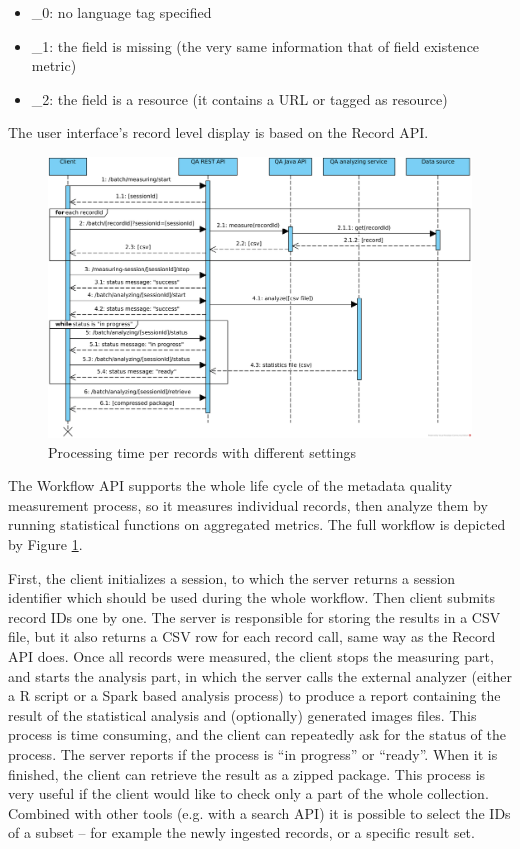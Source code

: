 \begin{itemize}
  \setlength{\parskip}{0pt}
  \setlength{\itemsep}{0pt plus 1pt}
  \item \_0: no language tag specified
  \item \_1: the field is missing (the very same information that of field existence metric)
  \item \_2: the field is a resource (it contains a URL or tagged as resource)
\end{itemize}

The user interface's record level display is based on the Record API.

\begin{figure}
\includegraphics[width=\textwidth]{images/chapter05/QA-REST-API-interactions.png}
\caption{Processing time per records with different settings}
\label{fig:workflow-api}
\end{figure}

The Workflow API supports the whole life cycle of the metadata quality measurement process, so it measures individual records, then analyze them by running statistical functions on aggregated metrics. The full workflow is depicted by Figure \ref{fig:workflow-api}. 

First, the client initializes a session, to which the server returns a session identifier which should be used during the whole workflow. Then client submits record IDs one by one. The server is responsible for storing the results in a CSV file, but it also returns a CSV row for each record call, same way as the Record API does. Once all records were measured, the client stops the measuring part, and starts the analysis part, in which the server calls the external analyzer (either a R script or a Spark based analysis process) to produce a report containing the result of the statistical analysis and (optionally) generated images files. This process is time consuming, and the client can repeatedly ask for the status of the process. The server reports if the process is ``in progress'' or ``ready''. When it is finished, the client can retrieve the result as a zipped package. This process is very useful if the client would like to check only a part of the whole collection. Combined with other tools (e.g. with a search API) it is possible to select the IDs of a subset -- for example the newly ingested records, or a specific result set.

